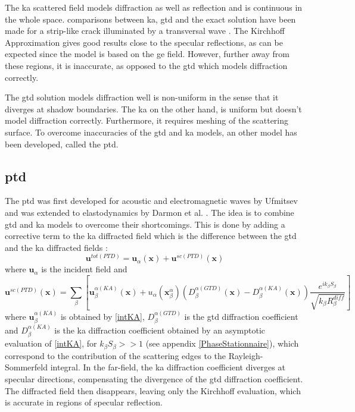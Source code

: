 The \acrshort{ka} scattered field models diffraction as well as reflection and is continuous in the whole space. comparisons between \acrshort{ka}, \acrshort{gtd} and the exact solution have been made for a strip-like crack illuminated by a transversal wave \cite{POChapman,systmodel}. The Kirchhoff Approximation gives good results close to the specular reflections, as can be expected since the model is based on the \acrshort{ge} field. However, further away from these regions, it is inaccurate, as opposed to the \acrshort{gtd} which models diffraction correctly.

The \acrshort{gtd} solution models diffraction well is non-uniform in the sense that it diverges at shadow boundaries. The \acrshort{ka} on the other hand, is uniform but doesn't model diffraction correctly. Furthermore, it requires meshing of the scattering surface. To overcome inaccuracies of the \acrshort{gtd} and \acrshort{ka} models, an other model has been developed, called the \acrfull{ptd}.

\subsection{\acrfull{ptd}}
The \acrfull{ptd} was first developed for acoustic and electromagnetic waves by Ufmitsev \cite{Ufmi} and was extended to elastodynamics by Darmon et al. \cite{DarmonKA}. The idea is to combine \acrshort{gtd} and \acrshort{ka} models to overcome their shortcomings. This is done by adding a corrective term to the \acrshort{ka} diffracted field which is the difference between the \acrshort{gtd} and the \acrshort{ka} diffracted fields :
\begin{equation}
\mathbf{u}^{tot (PTD)}=\mathbf{u}_{\alpha}(\mathbf{x})+\mathbf{u}^{sc (PTD)}(\mathbf{x})
\end{equation}
where $\mathbf{u}_{\alpha}$ is the incident field and
\begin{equation}
\mathbf{u}^{sc (PTD)}(\mathbf{x})=\sum_{\beta}\left[\mathbf{u}^{\alpha(KA)}_{\beta}(\mathbf{x})+u_{\alpha}(\mathbf{x}_{\beta}^{\alpha})\left(D_{\beta}^{\alpha(GTD)}(\mathbf{x})-D_{\beta}^{\alpha(KA)}(\mathbf{x})\right)\dfrac{e^{ik_{\beta}S_{\beta}}}{\sqrt{k_{\beta}R_{\beta}^{diff}}}\right]
\label{eqPTD}
\end{equation}
where  $\mathbf{u}^{\alpha(KA)}_{\beta}$ is obtained by \eqref{intKA}, $D_{\beta}^{\alpha(GTD)}$ is the \acrshort{gtd} diffraction coefficient and $D_{\beta}^{\alpha(KA)}$ is the \acrshort{ka} diffraction coefficient obtained by an asymptotic evaluation of \eqref{intKA}, for $k_{\beta}S_{\beta}>>1$ (see appendix \ref{PhaseStationnaire}), which correspond to the contribution of the scattering edges to the Rayleigh-Sommerfeld integral. In the far-field, the \acrshort{ka} diffraction coefficient diverges at specular directions, compensating the divergence of the \acrshort{gtd} diffraction coefficient. The diffracted field then disappears, leaving only the Kirchhoff evaluation, which is accurate in regions of specular reflection.

